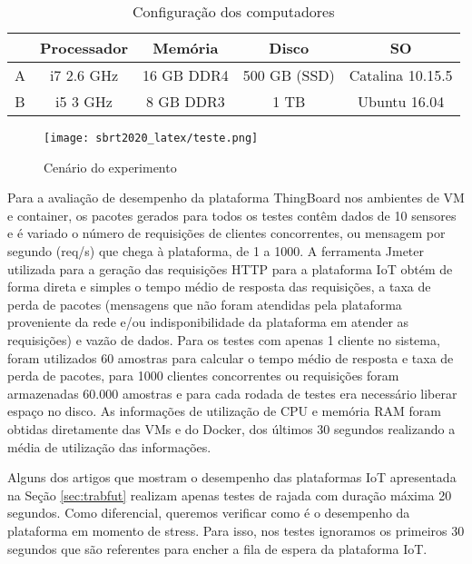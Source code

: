 \documentclass{sbrt}
\begin{document}
\begin{table}[h]
\centering
\caption{Configuração dos computadores}
\label{tab:ava_compt}
\begin{tabular}{ccccc}
\hline
             & \textbf{Processador} & \textbf{Memória} & \textbf{Disco} & \textbf{SO} \\ \hline
 A & i7 2.6 GHz            & 16 GB DDR4           & 500 GB (SSD)         & Catalina 10.15.5                       \\ \hline
 B & i5 3 GHz              & 8 GB DDR3             & 1 TB           & Ubuntu 16.04                \\ \hline
\end{tabular}
\hspace{10mm}
\end{table}

\begin{figure}[ht]
\centering
\captionsetup{justification=centering}
\begin{center}
\texttt{[image: sbrt2020\_latex/teste.png]}
\vspace*{-3mm}
\end{center}
\caption{Cenário do experimento}
\label{fig:teste}
\end{figure}

Para a avaliação de desempenho da plataforma ThingBoard nos ambientes de VM e container, os pacotes gerados para todos os testes contêm dados de 10 sensores e é variado o número de requisições de clientes concorrentes, ou mensagem por segundo (req/s) que chega à plataforma, de 1 a 1000. A ferramenta Jmeter utilizada para a geração das requisições HTTP para a plataforma IoT obtém de forma direta e simples o tempo médio de resposta das requisições, a taxa de perda de pacotes (mensagens que não foram atendidas pela plataforma proveniente da rede e/ou indisponibilidade da plataforma em atender as requisições) e vazão de dados. Para os testes com apenas 1 cliente no sistema, foram utilizados 60 amostras para calcular o tempo médio de resposta e taxa de perda de pacotes, para 1000 clientes concorrentes ou requisições foram armazenadas 60.000 amostras e para cada rodada de testes era necessário liberar espaço no disco. As informações de utilização de CPU e memória RAM foram obtidas diretamente das VMs e do Docker, dos últimos 30 segundos realizando a média de utilização das informações.

Alguns dos artigos que mostram o desempenho das plataformas IoT apresentada na Seção \ref{sec:trabfut} realizam apenas testes de rajada com duração máxima 20 segundos. Como diferencial, queremos verificar como é o desempenho da plataforma em momento de stress. Para isso, nos testes ignoramos os primeiros 30 segundos que são referentes para encher a fila de espera da plataforma IoT.
\end{document}
